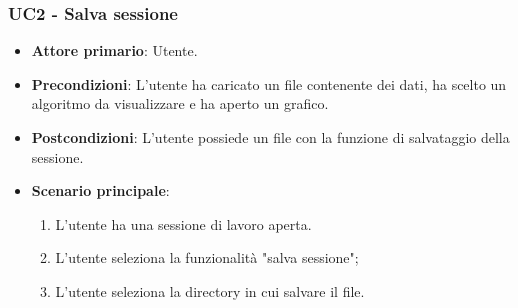 \subsubsection{UC2 - Salva sessione}
\begin{itemize}
	\item \textbf{Attore primario}: Utente.
	\item \textbf{Precondizioni}: L'utente ha caricato un file contenente dei dati, ha scelto un algoritmo da visualizzare e ha aperto un grafico.
	\item \textbf{Postcondizioni}: L'utente possiede un file con la funzione di salvataggio della sessione.
	\item \textbf{Scenario principale}:
		\begin{enumerate}
			\item L'utente ha una sessione di lavoro aperta.
			\item L'utente seleziona la funzionalità "salva sessione";
			\item L'utente seleziona la directory in cui salvare il file.
		\end{enumerate}
\end{itemize}